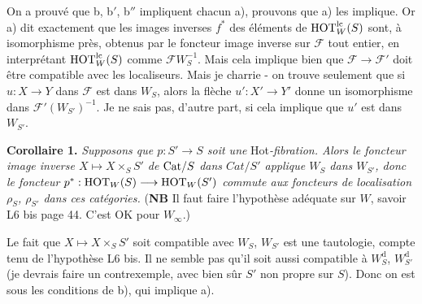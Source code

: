 On a prouvé que b, b$'$, b$''$ impliquent chacun a), prouvons que a) les implique. Or a) dit exactement que les images inverses $f^*$ des éléments de $\mathrm{HOT}_W^{\mathrm{lc}}(S)$
sont, à isomorphisme près, obtenus par le foncteur image inverse sur $\mathcal{F}$ tout entier, en interprétant $\mathrm{HOT}_W^{\mathrm{lc}}(S)$ comme $\mathcal{F}W_S^{-1}$. Mais cela implique bien que $\mathcal{F} \longrightarrow \mathcal{F}'$ doit être compatible avec les localiseurs. Mais je charrie - on trouve seulement que si $u : X \longrightarrow Y$ dans $\mathcal{F}$ est dans $W_S$, alors la flèche $u' : X' \longrightarrow Y'$ donne un isomorphisme dans $\mathcal{F}'(W_{S'})^{-1}$. Je ne sais pas, d'autre part, si cela implique que $u'$ est dans $W_{S'}$.

\textbf{Corollaire 1.} \textit{Supposons que $p : S' \longrightarrow S$ soit une} Hot\textit{-fibration. Alors le foncteur image inverse $X \longmapsto X \times_S S'$ de} $\mathrm{Cat}/S$ \textit{dans $\mathit{Cat}/S'$ applique $W_S$ dans $W_{S'}$, donc le foncteur $p^* : \mathrm{HOT}_W(S) \longrightarrow \mathrm{HOT}_W(S')$ commute aux foncteurs de localisation $\rho_S$, $\rho_{S'}$ dans ces catégories.} (\textbf{NB} Il faut faire l'hypothèse adéquate sur $W$, savoir L6 bis page 44. C'est OK pour $W_\infty$.)

Le fait que $X \longmapsto X \times_S S'$ soit compatible avec $W_S$, $W_{S'}$ est une tautologie, compte tenu de l'hypothèse L6 bis. Il ne semble pas qu'il soit aussi compatible à $W_S^{\mathrm{d}}$, $W_{S'}^{\mathrm{d}}$ (je devrais faire un contrexemple, avec bien sûr $S'$ non propre sur $S$). Donc on est sous les conditions de b), qui implique a).


